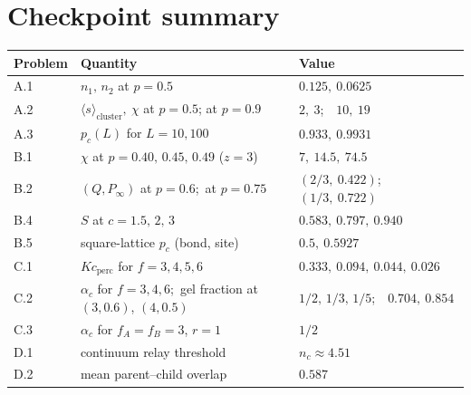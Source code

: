 \documentclass[11pt]{article}
\begin{document}
\section*{Checkpoint summary}
\begin{center}
\small
\begin{tabular}{lll}
\toprule
Problem & Quantity & Value\\
\midrule
A.1 & $n_1,\,n_2$ at $p=0.5$ & $0.125,\ 0.0625$\\
A.2 & $\langle s\rangle_{\text{cluster}},\ \chi$ at $p=0.5$; at $p=0.9$ & $2,\ 3$;\ \ $10,\ 19$\\
A.3 & $p_c(L)$ for $L=10,100$ & $0.933,\ 0.9931$\\
B.1 & $\chi$ at $p=0.40,\,0.45,\,0.49$ ($z=3$) & $7,\ 14.5,\ 74.5$\\
B.2 & $(Q,P_\infty)$ at $p=0.6$;\ at $p=0.75$ & $(2/3,\ 0.422)$;\ \ $(1/3,\ 0.722)$\\
B.4 & $S$ at $c=1.5,\,2,\,3$ & $0.583,\ 0.797,\ 0.940$\\
B.5 & square-lattice $p_c$ (bond, site) & $0.5,\ 0.5927$\\
C.1 & $Kc_{\text{perc}}$ for $f=3,4,5,6$ & $0.333,\ 0.094,\ 0.044,\ 0.026$\\
C.2 & $\alpha_c$ for $f=3,4,6$;\ gel fraction at $(3,0.6)$, $(4,0.5)$ & $1/2,\,1/3,\,1/5$;\ \ $0.704,\ 0.854$\\
C.3 & $\alpha_c$ for $f_A=f_B=3$, $r=1$ & $1/2$\\
D.1 & continuum relay threshold & $n_c\approx4.51$\\
D.2 & mean parent--child overlap & $0.587$\\
\bottomrule
\end{tabular}
\end{center}
\end{document}
